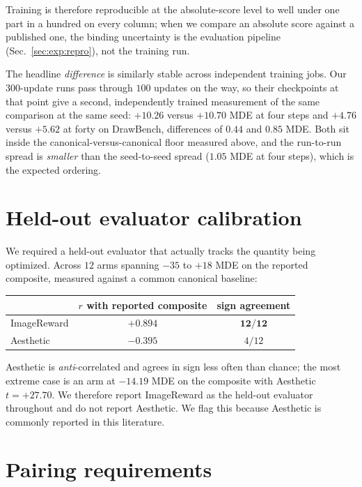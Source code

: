 Training is therefore reproducible at the absolute-score level to well under one part in a
hundred on every column; when we compare an absolute score against a published one, the
binding uncertainty is the evaluation pipeline (Sec.~\ref{sec:exp:repro}), not the training
run.

The headline \emph{difference} is similarly stable across independent training jobs. Our
$300$-update runs pass through $100$ updates on the way, so their checkpoints at that point
give a second, independently trained measurement of the same comparison at the same seed:
$+10.26$ versus $+10.70$ MDE at four steps and $+4.76$ versus $+5.62$ at forty on DrawBench,
differences of $0.44$ and $0.85$ MDE. Both sit inside the canonical-versus-canonical floor
measured above, and the run-to-run spread is \emph{smaller} than the seed-to-seed spread
($1.05$ MDE at four steps), which is the expected ordering.

\section{Held-out evaluator calibration}
\label{app:evalcal}

We required a held-out evaluator that actually tracks the quantity being optimized. Across
$12$ arms spanning $-35$ to $+18$ MDE on the reported composite, measured against a common
canonical baseline:

\begin{center}
\begin{tabular}{lcc}
\toprule
& $r$ with reported composite & sign agreement\\
\midrule
ImageReward & $\mathbf{+0.894}$ & $\mathbf{12/12}$\\
Aesthetic   & $-0.395$ & $4/12$\\
\bottomrule
\end{tabular}
\end{center}

Aesthetic is \emph{anti}-correlated and agrees in sign less often than chance; the most
extreme case is an arm at $-14.19$ MDE on the composite with Aesthetic $t=+27.70$. We
therefore report ImageReward as the held-out evaluator throughout and do not report
Aesthetic. We flag this because Aesthetic is commonly reported in this literature.

\section{Pairing requirements}
\label{app:pairing}


